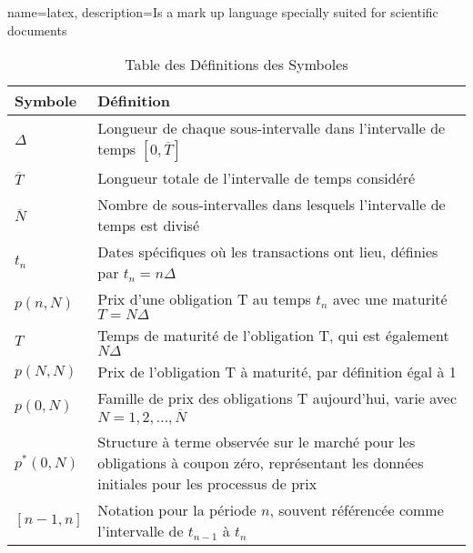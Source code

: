 
\printglossary[type=\acronymtype, title=Liste des abréviations,toctitle=Liste des abréviations]

{
        name=latex,
        description={Is a mark up language specially suited for 
scientific documents}
}

\begin{table}[h]
\centering
\caption{Table des Définitions des Symboles}
\begin{tabular}{|>{\bfseries}l|p{10cm}|}
\hline
Symbole & Définition \\
\hline
\( \Delta \) & Longueur de chaque sous-intervalle dans l'intervalle de temps \([0, \overline{T}]\) \\
\( \overline{T} \) & Longueur totale de l'intervalle de temps considéré \\
\( \overline{N} \) & Nombre de sous-intervalles dans lesquels l'intervalle de temps est divisé \\
\( t_n \) & Dates spécifiques où les transactions ont lieu, définies par \( t_n = n\Delta \) \\
\( p(n, N) \) & Prix d'une obligation T au temps \(t_n\) avec une maturité \(T = N\Delta\) \\
\( T \) & Temps de maturité de l'obligation T, qui est également \(N\Delta\) \\
\( p(N, N) \) & Prix de l'obligation T à maturité, par définition égal à 1 \\
\( p(0, N) \) & Famille de prix des obligations T aujourd'hui, varie avec \(N = 1, 2, \ldots, \overline{N}\) \\
\( p^*(0, N) \) & Structure à terme observée sur le marché pour les obligations à coupon zéro, représentant les données initiales pour les processus de prix \\
\([n-1, n]\) & Notation pour la période \(n\), souvent référencée comme l'intervalle de \(t_{n-1}\) à \(t_n\) \\
\hline
\end{tabular}
\end{table}

